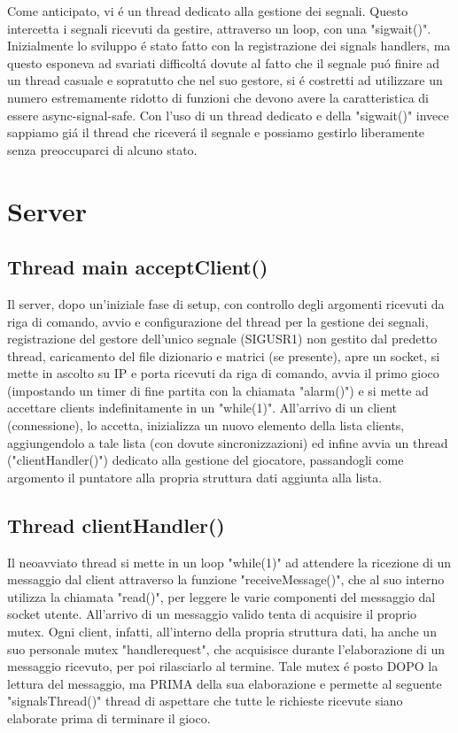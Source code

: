 Come anticipato, vi \'e un thread dedicato alla gestione dei segnali. Questo intercetta i segnali ricevuti da gestire, attraverso un loop, con una "sigwait()". Inizialmente lo sviluppo \'e stato fatto con la registrazione dei signals handlers, ma questo esponeva ad svariati difficolt\'a dovute al fatto che il segnale pu\'o finire ad un thread casuale e sopratutto che nel suo gestore, si \'e costretti ad utilizzare un numero estremamente ridotto di funzioni che devono avere la caratteristica di essere async-signal-safe. Con l'uso di un thread dedicato e della "sigwait()" invece sappiamo gi\'a il thread che ricever\'a il segnale e possiamo gestirlo liberamente senza preoccuparci di alcuno stato.

\section{Server}

\subsection{Thread main acceptClient()}

Il server, dopo un'iniziale fase di setup, con controllo degli argomenti ricevuti da riga di comando, avvio e configurazione del thread per la gestione dei segnali, registrazione del gestore dell'unico segnale (SIGUSR1) non gestito dal predetto thread, caricamento del file dizionario e matrici (se presente), apre un socket, si mette in ascolto su IP e porta ricevuti da riga di comando, avvia il primo gioco (impostando un timer di fine partita con la chiamata "alarm()") e si mette ad accettare clients indefinitamente in un "while(1)". All'arrivo di un client (connessione), lo accetta, inizializza un nuovo elemento della lista clients, aggiungendolo a tale lista (con dovute sincronizzazioni) ed infine avvia un thread ("clientHandler()") dedicato alla gestione del giocatore, passandogli come argomento il puntatore alla propria struttura dati aggiunta alla lista.

 \subsection{Thread clientHandler()}

 Il neoavviato thread si mette in un loop "while(1)" ad attendere la ricezione di un messaggio dal client attraverso la funzione "receiveMessage()", che al suo interno utilizza la chiamata "read()", per leggere le varie componenti del messaggio dal socket utente. All'arrivo di un messaggio valido tenta di acquisire il proprio mutex. Ogni client, infatti, all'interno della propria struttura dati, ha anche un suo personale mutex "handlerequest", che acquisisce durante l'elaborazione di un messaggio ricevuto, per poi rilasciarlo al termine. Tale mutex \'e posto DOPO la lettura del messaggio, ma PRIMA della sua elaborazione e permette al seguente "signalsThread()" thread di aspettare che tutte le richieste ricevute siano elaborate prima di terminare il gioco.
 
